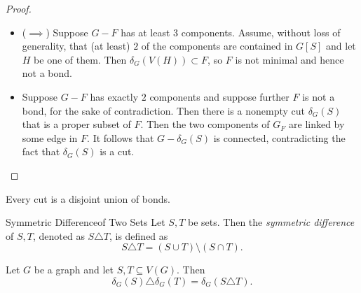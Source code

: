 \documentclass[co342]{subfiles}
\begin{document}
    \clearpage
    \begin{proof}
        \begin{itemize}
            \item ($\implies$) Suppose $G-F$ has at least $3$ components. Assume, without loss of generality, that (at least) $2$ of the components are contained in $G\left[ S \right]$ and let $H$ be one of them. Then $\delta_G\left( V\left( H \right)  \right) \subset F$, so $F$ is not minimal and hence not a bond.
            \item Suppose $G-F$ has exactly $2$ components and suppose further $F$ is not a bond, for the sake of contradiction. Then there is a nonempty cut $\delta_G\left( S \right)$ that is a proper subset of $F$. Then the two components of $G_F$ are linked by some edge in $F$. It follows that $G-\delta_G\left( S \right)$ is connected, contradicting the fact that $\delta_G\left( S \right)$ is a cut. \qqedsym
        \end{itemize} 
    \end{proof}

    \begin{prop}{}
        Every cut is a disjoint union of bonds.
    \end{prop}

    \begin{definition}{Symmetric Difference}{of Two Sets}
        Let $S,T$ be sets. Then the \emph{symmetric difference} of $S,T$, denoted as $S\triangle T$, is defined as
        \begin{equation*}
            S\triangle T = \left( S\cup T \right) \setminus\left( S\cap T \right) .
        \end{equation*}
    \end{definition}

    \begin{lemma_inside}{}
        Let $G$ be a graph and let $S,T\subseteq V\left( G \right)$. Then
        \begin{equation*}
            \delta_G\left( S \right) \triangle \delta_G\left( T \right) = \delta_G\left( S\triangle T \right).
        \end{equation*}
    \end{lemma_inside}
\end{document}
